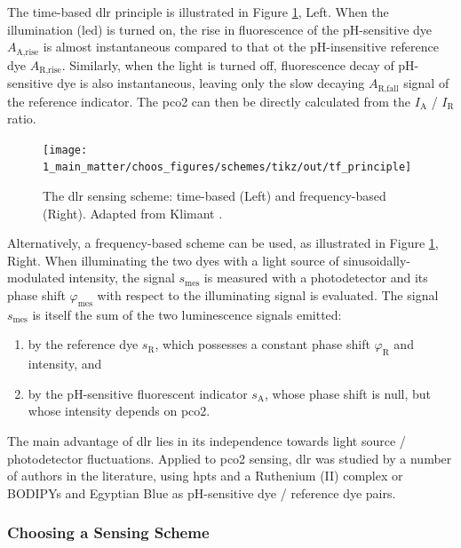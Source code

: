 The time-based \gls{dlr} principle is illustrated in Figure \ref{fig:choos:dye_based:advanced:tf_principle}, Left. When the illumination (\gls{led}) is turned on, the rise in fluorescence of the pH-sensitive dye $A_\text{A,rise}$ is almost instantaneous compared to that ot the pH-insensitive reference dye $A_\text{R,rise}$. Similarly, when the light is turned off, fluorescence decay of pH-sensitive dye is also instantaneous, leaving only the slow decaying $A_\text{R,fall}$ signal of the reference indicator. The \gls{pco2} can then be directly calculated from the $I_\text{A}$ / $I_\text{R}$ ratio\cite{klimant2001_pap}.

\begin{figure}
	\centering
	\texttt{[image: 1\_main\_matter/choos\_figures/schemes/tikz/out/tf\_principle]}
	\caption[The \gls{dlr} sensing scheme.]{The \gls{dlr} sensing scheme: time-based (Left) and frequency-based (Right). Adapted from Klimant \etal{}\cite{klimant2001_pap}.}
	\label{fig:choos:dye_based:advanced:tf_principle}
\end{figure}

Alternatively, a frequency-based scheme can be used, as illustrated in Figure \ref{fig:choos:dye_based:advanced:tf_principle}, Right. When illuminating the two dyes with a light source of sinusoidally-modulated intensity, the signal $s_\text{mes}$ is measured with a photodetector and its phase shift $\varphi_\text{mes}$ with respect to the illuminating signal is evaluated. The signal $s_\text{mes}$ is itself the sum of the two luminescence signals emitted:
\begin{enumerate}
	\item by the reference dye $s_\text{R}$, which possesses a constant phase shift $\varphi_\text{R}$ and intensity, and
	\item by the pH-sensitive fluorescent indicator $s_\text{A}$, whose phase shift is null, but whose intensity depends on \gls{pco2}\cite{klimant2001_pap}.
\end{enumerate}

The main advantage of \gls{dlr} lies in its independence towards light source / photodetector fluctuations. Applied to \gls{pco2} sensing, \gls{dlr} was studied by a number of authors in the literature, using \gls{hpts} and a Ruthenium (II) complex\cite{bultzingslowen2002, burke2006, cajlakovic2006} or BODIPYs and Egyptian Blue\cite{fritzsche2017, staudinger2018, pfeifer2020} as pH-sensitive dye / reference dye pairs.

\subsubsection{Choosing a Sensing Scheme}


